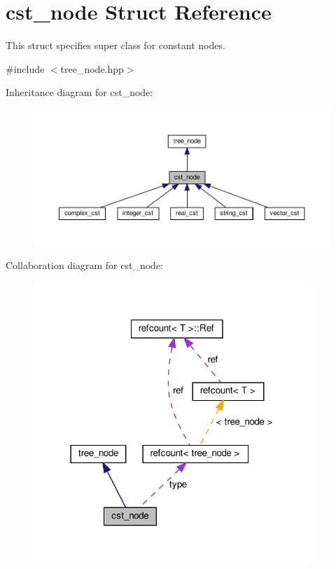 \hypertarget{structcst__node}{}\section{cst\+\_\+node Struct Reference}
\label{structcst__node}


This struct specifies super class for constant nodes.  




{\ttfamily \#include $<$tree\+\_\+node.\+hpp$>$}



Inheritance diagram for cst\+\_\+node\+:
\nopagebreak
\begin{figure}[H]
\begin{center}
\leavevmode
\includegraphics[width=350pt]{d4/dcf/structcst__node__inherit__graph}
\end{center}
\end{figure}


Collaboration diagram for cst\+\_\+node\+:
\nopagebreak
\begin{figure}[H]
\begin{center}
\leavevmode
\includegraphics[width=297pt]{db/ddd/structcst__node__coll__graph}
\end{center}
\end{figure}
